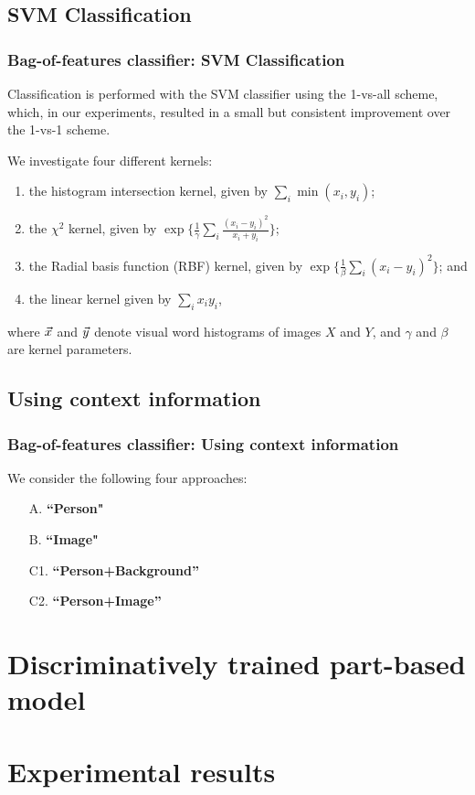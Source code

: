 \documentclass{beamer}
\def\v#1{\protect\vec #1}
\begin{document}
\subsection{SVM Classification}
\begin{frame}
\frametitle{Bag-of-features classifier: SVM Classification}

Classification is performed with
the SVM classifier using the 1-vs-all scheme, which, in our experiments, resulted in a small but consistent improvement
over the 1-vs-1 scheme. 
 
We investigate four different kernels: 
\begin{enumerate}
\item the histogram intersection kernel, given by $\sum_i \min(x_i,y_i)$;
\item the $\chi^2$ kernel, given by $\exp\{\frac{1}{\gamma} \sum_i \frac{(x_i-y_i)^2}{x_i+y_i}\}$; 
\item  the Radial basis function (RBF) kernel, given by  $\exp\{\frac{1}{\beta} \sum_i (x_i-y_i)^2\}$; and
\item the linear kernel given by $\sum_i x_i y_i$,
\end{enumerate}

where $\v x$ and $\v y$ denote visual word histograms of images $X$ and $Y$, and $\gamma$ and $\beta$ are
kernel parameters.

\end{frame}



\subsection{Using context information}
\begin{frame}
\frametitle{Bag-of-features classifier: Using context information}

We consider the following four approaches:
\begin{enumerate}
\item[A.] {\bf ``Person"} 
\item[B.] {\bf ``Image"} 
\item[C1.] {\bf ``Person+Background''} 
\item[C2.] {\bf ``Person+Image''}
\end{enumerate}

\end{frame}


\section{Discriminatively trained part-based model}


\section{Experimental results}
\end{document}
